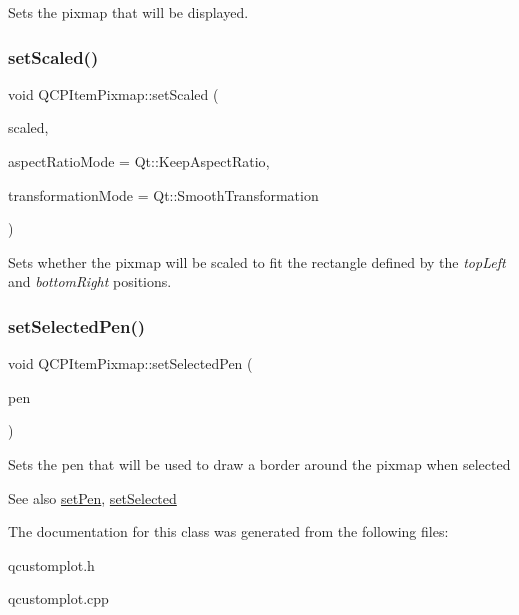 Sets the pixmap that will be displayed. \mbox{\label{class_q_c_p_item_pixmap_ab4d44529a1c6c8d37d0ea7560e042777}} 
\subsubsection{\texorpdfstring{set\+Scaled()}{setScaled()}}
{\footnotesize\ttfamily void Q\+C\+P\+Item\+Pixmap\+::set\+Scaled (\begin{DoxyParamCaption}\item[{bool}]{scaled,  }\item[{Qt\+::\+Aspect\+Ratio\+Mode}]{aspect\+Ratio\+Mode = {\ttfamily Qt\+:\+:KeepAspectRatio},  }\item[{Qt\+::\+Transformation\+Mode}]{transformation\+Mode = {\ttfamily Qt\+:\+:SmoothTransformation} }\end{DoxyParamCaption})}

Sets whether the pixmap will be scaled to fit the rectangle defined by the {\itshape top\+Left} and {\itshape bottom\+Right} positions. \mbox{\label{class_q_c_p_item_pixmap_afc5e479e88e53740176ce77cb70dd67a}} 
\subsubsection{\texorpdfstring{set\+Selected\+Pen()}{setSelectedPen()}}
{\footnotesize\ttfamily void Q\+C\+P\+Item\+Pixmap\+::set\+Selected\+Pen (\begin{DoxyParamCaption}\item[{const Q\+Pen \&}]{pen }\end{DoxyParamCaption})}

Sets the pen that will be used to draw a border around the pixmap when selected

\begin{DoxySeeAlso}{See also}
\hyperlink{class_q_c_p_item_pixmap_acdade1305edb4b5cae14f97fd132065f}{set\+Pen}, \hyperlink{class_q_c_p_abstract_item_a203de94ad586cc44d16c9565f49d3378}{set\+Selected} 
\end{DoxySeeAlso}


The documentation for this class was generated from the following files\+:\begin{DoxyCompactItemize}
\item 
qcustomplot.\+h\item 
qcustomplot.\+cpp\end{DoxyCompactItemize}
